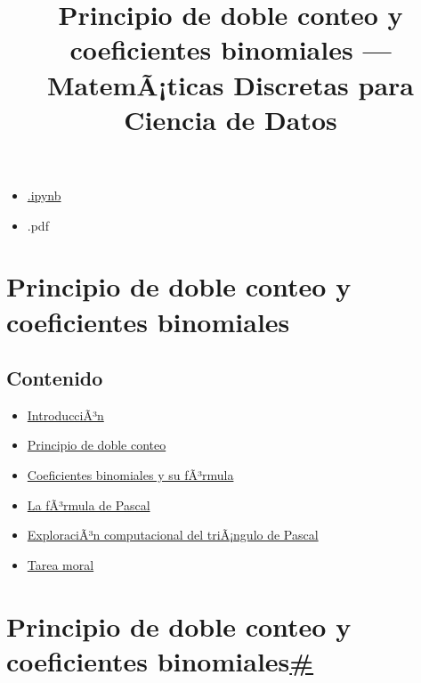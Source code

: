 \documentclass[
]{article}
\title{Principio de doble conteo y coeficientes binomiales ---
MatemÃ¡ticas Discretas para Ciencia de Datos}
\author{}
\date{}
\providecommand{\tightlist}{%
  \setlength{\itemsep}{0pt}\setlength{\parskip}{0pt}}
\begin{document}
\maketitle

\label{main-content}
{}

\emph{}

\begin{itemize}
\tightlist
\item
  \href{../_sources/P1/DobleConteo.ipynb}{{ \emph{} } {.ipynb}}
\item
  { \emph{} } {.pdf}
\end{itemize}

{ \emph{} }

{}

\label{jb-print-docs-body}
\section{Principio de doble conteo y coeficientes
binomiales}\label{principio-de-doble-conteo-y-coeficientes-binomiales}

\label{print-main-content}
\label{jb-print-toc}
\subsection{Contenido}\label{contenido}

\begin{itemize}
\tightlist
\item
  \hyperref[introduccion]{IntroducciÃ³n}
\item
  \hyperref[principio-de-doble-conteo]{Principio de doble conteo}
\item
  \hyperref[coeficientes-binomiales-y-su-formula]{Coeficientes
  binomiales y su fÃ³rmula}
\item
  \hyperref[la-formula-de-pascal]{La fÃ³rmula de Pascal}
\item
  \hyperref[exploracion-computacional-del-triangulo-de-pascal]{ExploraciÃ³n
  computacional del triÃ¡ngulo de Pascal}
\item
  \hyperref[tarea-moral]{Tarea moral}
\end{itemize}

\label{searchbox}

\label{principio-de-doble-conteo-y-coeficientes-binomiales}
\section{\texorpdfstring{Principio de doble conteo y coeficientes
binomiales\hyperref[principio-de-doble-conteo-y-coeficientes-binomiales]{\#}}{Principio de doble conteo y coeficientes binomiales\#}}\label{principio-de-doble-conteo-y-coeficientes-binomiales-1}
\end{document}
